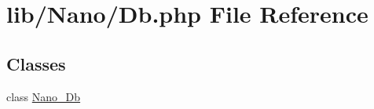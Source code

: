 \hypertarget{Db_8php}{
\section{lib/Nano/Db.php File Reference}
\label{Db_8php}
}
\subsection*{Classes}
\begin{CompactItemize}
\item 
class \hyperlink{classNano__Db}{Nano\_\-Db}
\end{CompactItemize}
